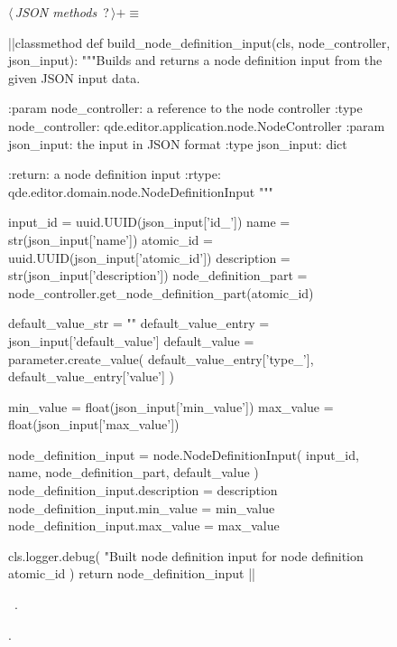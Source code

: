 \documentclass[%
    a4paper,    %
    justified,  %
    nobib,      %
    openany     %
]{tufte-book}
\begin{document}
\begin{figure}
\begin{flushleft} \small
\begin{minipage}{\linewidth}\label{scrap127}\raggedright\small
{} $\langle\,${\itshape JSON methods}\nobreak\ {\footnotesize {?}}$\,\rangle+\equiv$
\vspace{-1ex}
\begin{pythoncode}
|\normalfont{}\fontfamily{}|classmethod
def build_node_definition_input(cls, node_controller, json_input):
    """Builds and returns a node definition input from the given JSON input
    data.

    :param node_controller: a reference to the node controller
    :type  node_controller: qde.editor.application.node.NodeController
    :param json_input: the input in JSON format
    :type  json_input: dict

    :return: a node definition input
    :rtype:  qde.editor.domain.node.NodeDefinitionInput
    """

    input_id             = uuid.UUID(json_input['id_'])
    name                 = str(json_input['name'])
    atomic_id            = uuid.UUID(json_input['atomic_id'])
    description          = str(json_input['description'])
    node_definition_part = node_controller.get_node_definition_part(atomic_id)

    default_value_str = ""
    default_value_entry = json_input['default_value']
    default_value = parameter.create_value(
        default_value_entry['type_'],
        default_value_entry['value']
    )

    min_value = float(json_input['min_value'])
    max_value = float(json_input['max_value'])

    node_definition_input = node.NodeDefinitionInput(
        input_id,
        name,
        node_definition_part,
        default_value
    )
    node_definition_input.description = description
    node_definition_input.min_value = min_value
    node_definition_input.max_value = max_value

    cls.logger.debug(
        "Built node definition input for node definition %
        atomic_id
    )
    return node_definition_input
|\NWsep|
\end{pythoncode}
\vspace{1.5ex}
\footnotesize
\begin{list}{}{\setlength{\itemsep}{-\parsep}\setlength{\itemindent}{-\leftmargin}}
\item \NWtxtMacroDefBy\ .
\item {\NWtxtMacroNoRef}.


\end{list}
\end{minipage}
\end{flushleft}
\end{figure}
\end{document}
